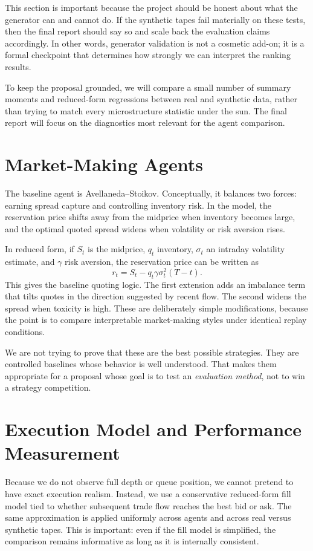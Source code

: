 \documentclass[10pt,letterpaper,twocolumn]{article}
\begin{document}
This section is important because the project should be honest about what the generator can and cannot do. If the synthetic tapes fail materially on these tests, then the final report should say so and scale back the evaluation claims accordingly. In other words, generator validation is not a cosmetic add-on; it is a formal checkpoint that determines how strongly we can interpret the ranking results.

To keep the proposal grounded, we will compare a small number of summary moments and reduced-form regressions between real and synthetic data, rather than trying to match every microstructure statistic under the sun. The final report will focus on the diagnostics most relevant for the agent comparison.

\section{Market-Making Agents}

The baseline agent is Avellaneda--Stoikov. Conceptually, it balances two forces: earning spread capture and controlling inventory risk. In the model, the reservation price shifts away from the midprice when inventory becomes large, and the optimal quoted spread widens when volatility or risk aversion rises.

In reduced form, if $S_t$ is the midprice, $q_t$ inventory, $\sigma_t$ an intraday volatility estimate, and $\gamma$ risk aversion, the reservation price can be written as
\[
r_t = S_t - q_t\gamma\sigma_t^2(T-t).
\]
This gives the baseline quoting logic. The first extension adds an imbalance term that tilts quotes in the direction suggested by recent flow. The second widens the spread when toxicity is high. These are deliberately simple modifications, because the point is to compare interpretable market-making styles under identical replay conditions.

We are not trying to prove that these are the best possible strategies. They are controlled baselines whose behavior is well understood. That makes them appropriate for a proposal whose goal is to test an \emph{evaluation method}, not to win a strategy competition.

\section{Execution Model and Performance Measurement}

Because we do not observe full depth or queue position, we cannot pretend to have exact execution realism. Instead, we use a conservative reduced-form fill model tied to whether subsequent trade flow reaches the best bid or ask. The same approximation is applied uniformly across agents and across real versus synthetic tapes. This is important: even if the fill model is simplified, the comparison remains informative as long as it is internally consistent.
\end{document}
